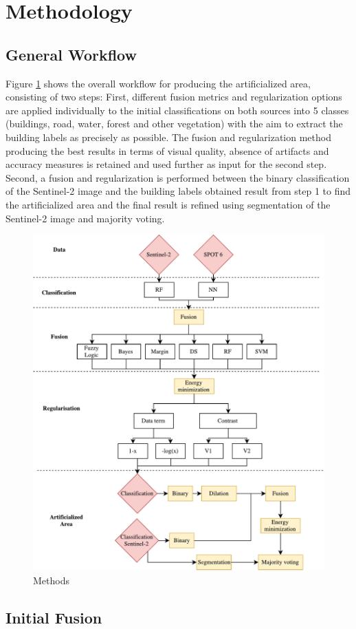 \documentclass[10pt]{article}
\begin{document}
\section{Methodology}\label{sec:method}
\subsection{General Workflow}
Figure \ref{fig:methods} shows the overall workflow for producing the artificialized area, consisting of two steps: First, different fusion metrics and regularization options are applied individually to the initial classifications on both sources into 5 classes (buildings, road, water, forest and other vegetation) with the aim to extract the building labels as precisely as possible. The fusion and regularization method producing the best results in terms of visual quality, absence of artifacts and accuracy measures is retained and used further as input for the second step. Second, a fusion and regularization is performed between the binary classification of the Sentinel-2 image and the building labels obtained result from step 1 to find the artificialized area and the final result is refined using segmentation of the Sentinel-2 image and majority voting.

\begin{figure}[H]
    \centering
    \includegraphics[width=.7\textwidth]{IGN-methods}
    \caption{Methods}
    \label{fig:methods}
\end{figure}

\subsection{Initial Fusion}
\end{document}
